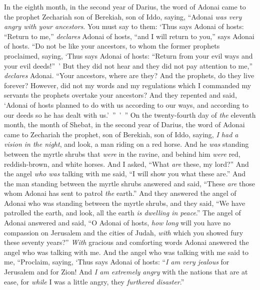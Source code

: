 
\begin{biblechapter} %
\verse In the eighth month, in the second year of Darius, the word of Adonai came to the prophet Zechariah son of Berekiah, son of Iddo, saying,
\verse “Adonai \textit{was very angry with your ancestors}.
\verse You must say to them: ‘Thus says Adonai of hosts: “Return to me,” \textit{declares} Adonai of hosts, “and I will return to you,” says Adonai of hosts.
\verse “Do not be like your ancestors, to whom the former prophets proclaimed, saying, ‘Thus says Adonai of hosts: “Return from your evil ways and your evil deeds!” ’ But they did not hear and they did not pay attention to me,” \textit{declares} Adonai.
\verse “Your ancestors, where are they? And the prophets, do they live forever?
\verse However, did not my words and my regulations which I commanded my servants the prophets overtake your ancestors? And they repented and said, ‘Adonai of hosts planned to do with us according to our ways, and according to our deeds so he has dealt with us.’ ” ’ ”
 On the twenty-fourth day of \textit{the} eleventh month, the month of Shebat, in the second year of Darius, the word of Adonai came to Zechariah the prophet, son of Berekiah, son of Iddo, saying,
\verse \textit{I had a vision in the night}, and look, a man riding on a red horse. And he \textit{was} standing between the myrtle shrubs that \textit{were} in the ravine, and behind him \textit{were} red, reddish-brown, and white horses.
\verse And I asked, “What \textit{are} these, my lord?” And the angel \textit{who was} talking with me said, “I will show you what these are.”
\verse And the man standing between the myrtle shrubs answered and said, “These \textit{are} those whom Adonai has sent to patrol \textit{the} earth.”
\verse And they answered the angel of Adonai who was standing between the myrtle shrubs, and they said, “We have patrolled the earth, and look, all the earth \textit{is dwelling in peace}.”
\verse The angel of Adonai answered and said, “O Adonai of hosts, \textit{how long} will you have no compassion on Jerusalem and the cities of Judah, \textit{with} which you showed fury these seventy years?”
\verse \textit{With} gracious and comforting words Adonai answered the angel who was talking with me.
\verse And the angel who was talking with me said to me, “Proclaim, saying, ‘Thus says Adonai of hosts: “\textit{I am very jealous} for Jerusalem and for Zion!
\verse And \textit{I am extremely angry} with the nations that are at ease, for \textit{while} I was a little angry, they \textit{furthered disaster}.”

\end{biblechapter}
